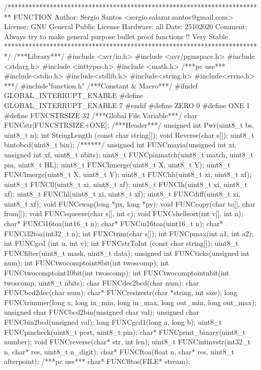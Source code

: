 \begin{verbatimtab}
/*************************************************************************
FUNCTION
Author: Sergio Santos
<sergio.salazar.santos@gmail.com> 
License: GNU General Public License
Hardware: all
Date: 25102020
Comment:
Always try to make general purpose bullet proof functions !!
Very Stable
*************************************************************************/
/***Library***/
#include <avr/io.h>
#include <avr/pgmspace.h>
#include <stdarg.h>
#include <inttypes.h>
#include <math.h>
/***pc use***
#include<stdio.h>
#include<stdlib.h>
#include<string.h>
#include<errno.h>
***/
#include"function.h"
/***Constant & Macro***/
#ifndef GLOBAL_INTERRUPT_ENABLE
#define GLOBAL_INTERRUPT_ENABLE 7
#endif
#define ZERO 0
#define ONE 1
#define FUNCSTRSIZE 32
/***Global File Variable***/
char FUNCstr[FUNCSTRSIZE+ONE];
/***Header***/
unsigned int Pwr(uint8_t bs, uint8_t n);
int StringLength (const char string[]);
void Reverse(char s[]);
uint8_t  bintobcd(uint8_t bin);
/******/
unsigned int FUNCmayia(unsigned int xi, unsigned int xf, uint8_t nbits);
uint8_t FUNCpinmatch(uint8_t match, uint8_t pin, uint8_t HL);
uint8_t FUNChmerge(uint8_t X, uint8_t Y);
uint8_t FUNClmerge(uint8_t X, uint8_t Y);
uint8_t FUNChh(uint8_t xi, uint8_t xf);
uint8_t FUNCll(uint8_t xi, uint8_t xf);
uint8_t FUNClh(uint8_t xi, uint8_t xf);
uint8_t FUNChl(uint8_t xi, uint8_t xf);
uint8_t FUNCdiff(uint8_t xi, uint8_t xf);
void FUNCswap(long *px, long *py);
void FUNCcopy(char to[], char from[]);
void FUNCsqueeze(char s[], int c);
void FUNCshellsort(int v[], int n);
char* FUNCi16toa(int16_t n);
char* FUNCui16toa(uint16_t n);
char* FUNCi32toa(int32_t n);
int FUNCtrim(char s[]);
int FUNCpmax(int a1, int a2);
int FUNCgcd (int u, int v);
int FUNCstrToInt (const char string[]);
uint8_t FUNCfilter(uint8_t mask, uint8_t data);
unsigned int FUNCticks(unsigned int num);
int FUNCtwocomptoint8bit(int twoscomp);
int FUNCtwocomptoint10bit(int twoscomp);
int FUNCtwocomptointnbit(int twoscomp, uint8_t nbits);
char FUNCdec2bcd(char num);
char FUNCbcd2dec(char num);
char* FUNCresizestr(char *string, int size);
long FUNCtrimmer(long x, long in_min, long in_max, long out_min, long out_max);
unsigned char FUNCbcd2bin(unsigned char val);
unsigned char FUNCbin2bcd(unsigned val);
long FUNCgcd1(long a, long b);
uint8_t FUNCpincheck(uint8_t port, uint8_t pin);
char* FUNCprint_binary(uint8_t number);
void FUNCreverse(char* str, int len);
uint8_t FUNCintinvstr(int32_t n, char* res, uint8_t n_digit);
char* FUNCftoa(float n, char* res, uint8_t afterpoint);
/***pc use***
char* FUNCfltos(FILE* stream);

\end{verbatimtab}
